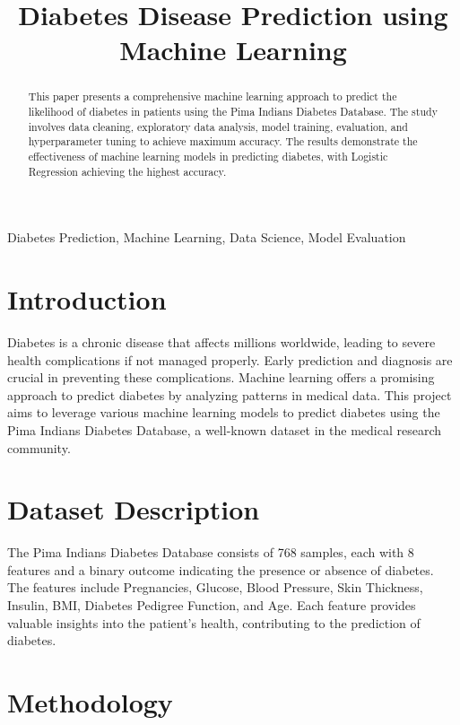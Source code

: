 \documentclass[conference]{IEEEtran}
\title{Diabetes Disease Prediction using Machine Learning}
\author{\IEEEauthorblockN{Author Name}
\IEEEauthorblockA{Department of Computer Science\\
University Name\\
Email: author@example.com}}
\begin{document}
\maketitle

\begin{abstract}
This paper presents a comprehensive machine learning approach to predict the likelihood of diabetes in patients using the Pima Indians Diabetes Database. The study involves data cleaning, exploratory data analysis, model training, evaluation, and hyperparameter tuning to achieve maximum accuracy. The results demonstrate the effectiveness of machine learning models in predicting diabetes, with Logistic Regression achieving the highest accuracy.
\end{abstract}

\begin{IEEEkeywords}
Diabetes Prediction, Machine Learning, Data Science, Model Evaluation
\end{IEEEkeywords}

\section{Introduction}
Diabetes is a chronic disease that affects millions worldwide, leading to severe health complications if not managed properly. Early prediction and diagnosis are crucial in preventing these complications. Machine learning offers a promising approach to predict diabetes by analyzing patterns in medical data. This project aims to leverage various machine learning models to predict diabetes using the Pima Indians Diabetes Database, a well-known dataset in the medical research community.

\section{Dataset Description}
The Pima Indians Diabetes Database consists of 768 samples, each with 8 features and a binary outcome indicating the presence or absence of diabetes. The features include Pregnancies, Glucose, Blood Pressure, Skin Thickness, Insulin, BMI, Diabetes Pedigree Function, and Age. Each feature provides valuable insights into the patient's health, contributing to the prediction of diabetes.

\section{Methodology}
\end{document}

